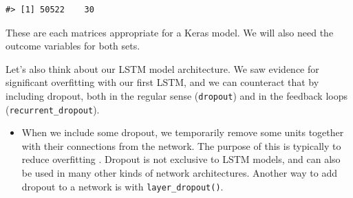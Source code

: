 \documentclass[
]{krantz}
\makeatletter
\newenvironment{Shaded}{\begin{snugshade}}{\end{snugshade}}
\newcommand{\DecValTok}[1]{\textcolor[rgb]{0.00,0.00,0.81}{#1}}
\newcommand{\FunctionTok}[1]{\textcolor[rgb]{0.00,0.00,0.00}{#1}}
\newcommand{\NormalTok}[1]{#1}
\newcommand{\OtherTok}[1]{\textcolor[rgb]{0.56,0.35,0.01}{#1}}
\newcommand{\SpecialCharTok}[1]{\textcolor[rgb]{0.00,0.00,0.00}{#1}}
\newenvironment{kframe}{%
\medskip{}
\setlength{\fboxsep}{.8em}
 \def\at@end@of@kframe{}%
 \ifinner\ifhmode%
  \def\at@end@of@kframe{\end{minipage}}%
  \begin{minipage}{\columnwidth}%
 \fi\fi%
 \def\FrameCommand##1{\hskip\@totalleftmargin \hskip-\fboxsep
 \colorbox{shadecolor}{##1}\hskip-\fboxsep
     \hskip-\linewidth \hskip-\@totalleftmargin \hskip\columnwidth}%
 \MakeFramed {\advance\hsize-\width
   \@totalleftmargin\z@ \linewidth\hsize
   \@setminipage}}%
 {\par\unskip\endMakeFramed%
 \at@end@of@kframe}
\renewenvironment{Shaded}{\begin{kframe}}{\end{kframe}}
\newenvironment{rmdblock}[1]
  {\begin{shaded*}
  \begin{itemize}[left = -1cm, labelsep = 1cm]
  \renewcommand{\labelitemi}{
    \raisebox{-.7\height}[0pt][0pt]{
      {\setkeys{Gin}{width=3em,keepaspectratio}\texttt{[image: images/\#1]}}
    }
  }
 
  \item
  }
  {
  \end{itemize}
  \end{shaded*}
  }
\newenvironment{rmdwarning}
  {\begin{rmdblock}{warning}}
  {\end{rmdblock}}
\makeatother
\begin{document}
\begin{verbatim}
#> [1] 50522    30
\end{verbatim}

These are each matrices appropriate for a Keras model. We will also need the outcome variables for both sets.

\begin{Shaded}
\end{Shaded}

Let's also think about our LSTM model architecture. We saw evidence for significant overfitting with our first LSTM, and we can counteract that by including dropout, both in the regular sense (\texttt{dropout}) and in the feedback loops (\texttt{recurrent\_dropout}).

\begin{rmdwarning}
When we include some dropout, we temporarily remove some units together with their connections from the network. The purpose of this is typically to reduce overfitting \citep{Srivastava2014}. Dropout is not exclusive to LSTM models, and can also be used in many other kinds of network architectures. Another way to add dropout to a network is with \texttt{layer\_dropout()}.
\end{rmdwarning}
\end{document}
